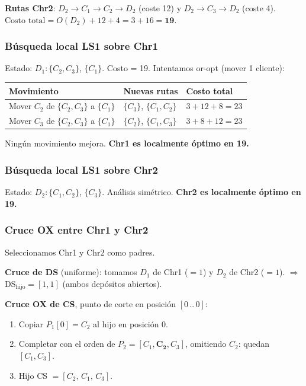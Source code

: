 \documentclass[12pt,a4paper]{article}
\begin{document}
\textbf{Rutas Chr2}: $D_2\!\to\!C_1\!\to\!C_2\!\to\!D_2$ (coste 12) y $D_2\!\to\!C_3\!\to\!D_2$ (coste 4).
$\text{Costo total} = O(D_2) + 12 + 4 = 3 + 16 = \mathbf{19}$.

\subsubsection*{Búsqueda local LS1 sobre Chr1}

Estado: $D_1:\{C_2,C_3\}$, $\{C_1\}$. Costo = 19. Intentamos or-opt (mover 1 cliente):

\begin{center}
\begin{tabular}{lll}
\toprule
Movimiento & Nuevas rutas & Costo total \\
\midrule
Mover $C_2$ de $\{C_2,C_3\}$ a $\{C_1\}$ & $\{C_3\}$, $\{C_1,C_2\}$ & $3+12+8=23$ \\
Mover $C_3$ de $\{C_2,C_3\}$ a $\{C_1\}$ & $\{C_2\}$, $\{C_1,C_3\}$ & $3+8+12=23$ \\
\bottomrule
\end{tabular}
\end{center}

Ningún movimiento mejora. \textbf{Chr1 es localmente óptimo en 19.}

\subsubsection*{Búsqueda local LS1 sobre Chr2}

Estado: $D_2:\{C_1,C_2\}$, $\{C_3\}$. Análisis simétrico. \textbf{Chr2 es localmente óptimo en 19.}

\subsubsection*{Cruce OX entre Chr1 y Chr2}

Seleccionamos Chr1 y Chr2 como padres.

\textbf{Cruce de DS} (uniforme): tomamos $D_1$ de Chr1 ($=1$) y $D_2$ de Chr2 ($=1$).
$\Rightarrow$ DS$_{\text{hijo}} = [1,1]$ (ambos depósitos abiertos).

\textbf{Cruce OX de CS}, punto de corte en posición $[0\,..\,0]$:
\begin{enumerate}[noitemsep]
  \item Copiar $P_1[0] = C_2$ al hijo en posición 0.
  \item Completar con el orden de $P_2 = [C_1,\mathbf{C_2},C_3]$, omitiendo $C_2$: quedan $[C_1, C_3]$.
  \item Hijo CS $= [C_2,\, C_1,\, C_3]$.
\end{enumerate}
\end{document}
